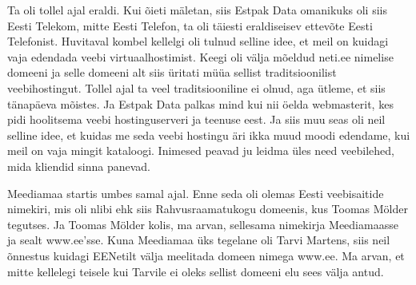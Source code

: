 
Ta oli tollel ajal eraldi. Kui õieti mäletan, siis Estpak Data omanikuks oli 
siis Eesti Telekom, mitte  Eesti Telefon, ta 
oli täiesti eraldiseisev ettevõte Eesti Telefonist. Huvitaval kombel kellelgi 
oli tulnud selline idee, et meil on kuidagi vaja edendada veebi  
virtuaalhostimist. Keegi oli välja mõeldud neti.ee nimelise 
domeeni ja selle domeeni alt siis üritati müüa sellist traditsioonilist 
veebihostingut. Tollel ajal ta veel traditsiooniline ei olnud, aga ütleme, et 
siis tänapäeva mõistes. Ja  Estpak Data palkas mind kui nii öelda webmasterit, 
kes pidi hoolitsema veebi hostinguserveri ja teenuse eest. Ja siis muu seas oli 
neil selline idee, et kuidas me seda veebi hostingu äri ikka muud moodi 
edendame, kui meil on vaja mingit kataloogi. Inimesed peavad ju leidma üles 
need veebilehed, mida  kliendid sinna panevad.


Meediamaa startis umbes samal ajal. Enne seda oli olemas  
Eesti veebisaitide nimekiri, mis oli nlibi ehk siis 
Rahvusraamatukogu domeenis, kus Toomas 
Mölder tegutses. Ja Toomas Mölder kolis, ma arvan, 
sellesama nimekirja Meediamaasse ja sealt www.ee'sse. Kuna 
Meediamaa üks tegelane oli Tarvi Martens, siis neil 
õnnestus kuidagi EENetilt välja meelitada domeen nimega 
www.ee. Ma arvan, et mitte kellelegi 
teisele kui Tarvile ei oleks sellist domeeni elu sees välja antud.



